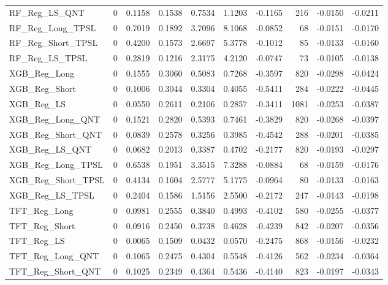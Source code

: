 \begin{tabular}{llrrrrrrrr}
\cline{1-10}
RF\_Reg\_LS\_QNT & 0 & 0.1158 & 0.1538 & 0.7534 & 1.1203 & -0.1165 & 216 & -0.0150 & -0.0211 \\
\cline{1-10}
RF\_Reg\_Long\_TPSL & 0 & 0.7019 & 0.1892 & 3.7096 & 8.1068 & -0.0852 & 68 & -0.0151 & -0.0170 \\
\cline{1-10}
RF\_Reg\_Short\_TPSL & 0 & 0.4200 & 0.1573 & 2.6697 & 5.3778 & -0.1012 & 85 & -0.0133 & -0.0160 \\
\cline{1-10}
RF\_Reg\_LS\_TPSL & 0 & 0.2819 & 0.1216 & 2.3175 & 4.2120 & -0.0747 & 73 & -0.0105 & -0.0138 \\
\cline{1-10}
XGB\_Reg\_Long & 0 & 0.1555 & 0.3060 & 0.5083 & 0.7268 & -0.3597 & 820 & -0.0298 & -0.0424 \\
\cline{1-10}
XGB\_Reg\_Short & 0 & 0.1006 & 0.3044 & 0.3304 & 0.4055 & -0.5411 & 284 & -0.0222 & -0.0445 \\
\cline{1-10}
XGB\_Reg\_LS & 0 & 0.0550 & 0.2611 & 0.2106 & 0.2857 & -0.3411 & 1081 & -0.0253 & -0.0387 \\
\cline{1-10}
XGB\_Reg\_Long\_QNT & 0 & 0.1521 & 0.2820 & 0.5393 & 0.7461 & -0.3829 & 820 & -0.0268 & -0.0397 \\
\cline{1-10}
XGB\_Reg\_Short\_QNT & 0 & 0.0839 & 0.2578 & 0.3256 & 0.3985 & -0.4542 & 288 & -0.0201 & -0.0385 \\
\cline{1-10}
XGB\_Reg\_LS\_QNT & 0 & 0.0682 & 0.2013 & 0.3387 & 0.4702 & -0.2177 & 820 & -0.0193 & -0.0297 \\
\cline{1-10}
XGB\_Reg\_Long\_TPSL & 0 & 0.6538 & 0.1951 & 3.3515 & 7.3288 & -0.0884 & 68 & -0.0159 & -0.0176 \\
\cline{1-10}
XGB\_Reg\_Short\_TPSL & 0 & 0.4134 & 0.1604 & 2.5777 & 5.1775 & -0.0964 & 80 & -0.0133 & -0.0163 \\
\cline{1-10}
XGB\_Reg\_LS\_TPSL & 0 & 0.2404 & 0.1586 & 1.5156 & 2.5500 & -0.2172 & 247 & -0.0143 & -0.0198 \\
\cline{1-10}
TFT\_Reg\_Long & 0 & 0.0981 & 0.2555 & 0.3840 & 0.4993 & -0.4102 & 580 & -0.0255 & -0.0377 \\
\cline{1-10}
TFT\_Reg\_Short & 0 & 0.0916 & 0.2450 & 0.3738 & 0.4628 & -0.4239 & 842 & -0.0207 & -0.0356 \\
\cline{1-10}
TFT\_Reg\_LS & 0 & 0.0065 & 0.1509 & 0.0432 & 0.0570 & -0.2475 & 868 & -0.0156 & -0.0232 \\
\cline{1-10}
TFT\_Reg\_Long\_QNT & 0 & 0.1065 & 0.2475 & 0.4304 & 0.5548 & -0.4126 & 562 & -0.0234 & -0.0364 \\
\cline{1-10}
TFT\_Reg\_Short\_QNT & 0 & 0.1025 & 0.2349 & 0.4364 & 0.5436 & -0.4140 & 823 & -0.0197 & -0.0343 \\

\end{tabular}

